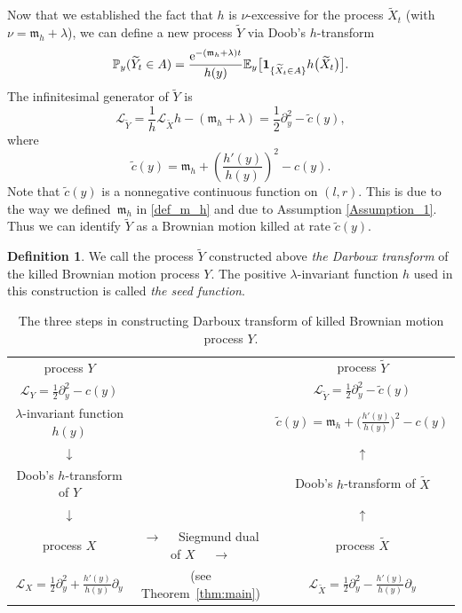 \documentclass[10pt,a4paper]{amsart}
\numberwithin{equation}{section}
\theoremstyle{definition}
\newtheorem{Definition}[Theorem]{Definition}
\def\L{{\mathcal L}}
\def\p{{\mathbb P}}
\def\e{{\mathbb E}}
\begin{document}
Now that we established the fact that $h$ is $\nu$-excessive for the process $\widetilde X_t$ (with $\nu={\mathfrak m}_h + \lambda$), we can define a new process $\widetilde Y$ via Doob's $h$-transform
\[
\p_y (\widetilde Y_t \in A)=\frac{{\rm e}^{-({\mathfrak m}_h+\lambda) t}}{h(y)}
\e_y\big[ {\mathbf 1}_{\{\widetilde X_t \in A\}} h\bigl(\widetilde X_t\bigr)\big].
\]
The infinitesimal generator of $\widetilde Y$ is
\[
\L_{\widetilde Y}=\frac{1}{h} \L_{\widetilde X} h - ({\mathfrak m}_h+\lambda)
=\frac{1}{2} \partial_y^2 - \tilde c(y),
\]
where
\begin{equation}\label{new_tilde_c}
\tilde c(y)={\mathfrak m}_h+\left(\frac{h'(y)}{h(y)}\right)^2 - c(y).
\end{equation}
Note that $\tilde c(y)$ is a nonnegative continuous function on $(l,r)$. This is due to the way we defined~${\mathfrak m}_h$ in \eqref{def_m_h} and due to Assumption \ref{Assumption_1}. Thus we can identify $\widetilde Y$ as a Brownian motion killed at rate $\tilde c(y)$.


\begin{Definition}\label{def_Darboux_transform}
{\textnormal{
We call the process $\widetilde Y$ constructed above {\it the Darboux transform} of the killed Brownian motion process $Y$. The positive $\lambda$-invariant function $h$ used in this construction is called {\it the seed function}. }}
\end{Definition}

\begin{table}[t!]\centering
\begin{tabular}{ c c c }
 process $Y$ & $\qquad \qquad \qquad \qquad $ & process $\widetilde Y$ \\
 $\L_Y=\frac{1}{2} \partial_y^2 - c(y)$ & & $\L_{\widetilde Y}=\frac{1}{2} \partial_y^2 - \tilde c(y)$ \\
 $\lambda$-invariant function $h(y)$ & & $\tilde c(y)={\mathfrak m}_h+\bigl(\frac{h'(y)}{h(y)} \bigr)^2 - c(y)$\\
 \rule{0pt}{15pt}
 $\downarrow$ & & $\uparrow$ \\
 \rule{0pt}{20pt}
 Doob's $h$-transform of $Y$ & & Doob's $h$-transform of $\widetilde X$ \\
 \rule{0pt}{15pt}
 $\downarrow$ & & $\uparrow$ \\
 \rule{0pt}{20pt}
 process $X$ & $\rightarrow \quad $ Siegmund dual of $X$
 $\quad \rightarrow $ & process $\widetilde X$ \\
 $\L_X=\frac{1}{2} \partial_y^2 + \frac{h'(y)}{h(y)} \partial_y$ & (see Theorem~\ref{thm:main}) & $\L_{\widetilde X}=\frac{1}{2} \partial_y^2 - \frac{h'(y)}{h(y)} \partial_y$ \\
\end{tabular}

\caption{The three steps in constructing Darboux transform of killed Brownian motion process $Y$.}\label{table:1}
\end{table}
\end{document}
